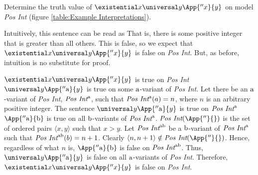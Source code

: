 \begin{majorILnc}{}
	Determine the truth value of $\existential\variable{x}\universal\variable{y}\App{''\variable{x}}{\variable{y}}$ on model \emph{Pos Int} (figure \ref{table:Example Interpretations}).
\end{majorILnc}
\begin{commentary}
	Intuitively, this sentence can be read as 
	That is, there is some positive integer that is greater than all others.
	This is false, so we expect that $\existential\variable{x}\universal\variable{y}\App{''\variable{x}}{\variable{y}}$ is false on \emph{Pos Int}.
	But, as before, intuition is no substitute for proof.
\end{commentary}
\begin{PROOF}
	$\existential\variable{x}\universal\variable{y}\App{''\variable{x}}{\variable{y}}$ is true on \emph{Pos Int} \Iff $\universal\variable{y}\App{''\constant{a}}{\variable{y}}$ is true on some $\mathrm{a}$-variant of \emph{Pos Int}. 
	Let there be an $\mathrm{a}$-variant of \emph{Pos Int}, $\emph{Pos Int}^{\mathrm{a}}$, such that $\emph{Pos Int}^{\mathrm{a}}(a)=n$, where $n$ is an arbitrary positive integer.
	The sentence $\universal\variable{y}\App{''\constant{a}}{\variable{y}}$ is true on $\emph{Pos Int}^{\mathrm{a}}$ \Iff $\App{''\constant{a}}{\constant{b}}$ is true on all $\mathrm{b}$-variants of $\emph{Pos Int}^{\mathrm{a}}$.
	$\emph{Pos Int}(\App{''}{})$ is the set of ordered pairs $\langle x, y \rangle$ such that $x>y$.
	Let $\emph{Pos Int}^{\mathrm{a}\mathrm{b}}$ be a $\mathrm{b}$-variant of $\emph{Pos Int}^{\mathrm{a}}$ such that $\emph{Pos Int}^{\mathrm{a}\mathrm{b}}(b)=n+1$.
	Clearly $\langle n, n+1 \rangle\notin\emph{Pos Int}(\App{''}{})$.
	Hence, regardless of what $n$ is, $\App{''\constant{a}}{\constant{b}}$ is false on $\emph{Pos Int}^{\mathrm{a}\mathrm{b}}$.
	Thus, $\universal\variable{y}\App{''\constant{a}}{\variable{y}}$ is false on all $\mathrm{a}$-variants of \emph{Pos Int}. 
	Therefore, $\existential\variable{x}\universal\variable{y}\App{''\variable{x}}{\variable{y}}$ is false on \emph{Pos Int}.
\end{PROOF}

